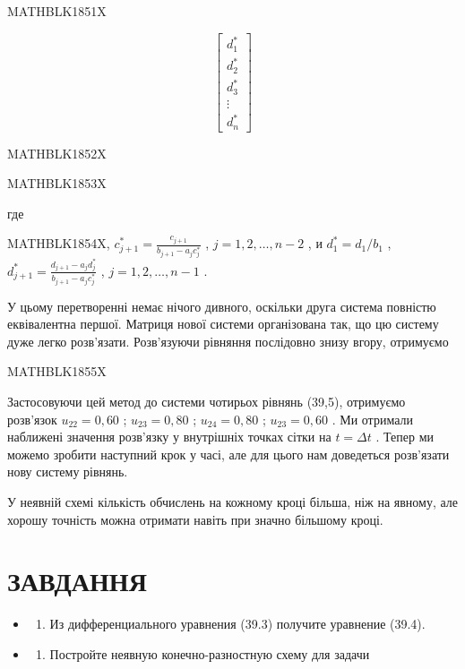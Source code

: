 \documentclass[
  ukrainian,
]{article}
\providecommand{\tightlist}{%
  \setlength{\itemsep}{0pt}\setlength{\parskip}{0pt}}
\begin{document}
MATHBLK1851X

\[
\begin{bmatrix} d_1^* \\ d_2^* \\ d_3^* \\ \vdots \\ d_n^* \end{bmatrix}
\]

MATHBLK1852X

MATHBLK1853X

где

MATHBLK1854X, \(c_{j+1}^* = \frac{c_{j+1}}{b_{j+1} - a_j c_j^*}\) ,
\(j = 1, 2, \ldots, n-2\) , и \(d_1^* = d_1/b_1\) ,
\(d_{j+1}^* = \frac{d_{j+1} - a_j d_j^*}{b_{j+1} - a_j c_j^*}\) ,
\(j = 1, 2, \ldots, n-1\) .

У цьому перетворенні немає нічого дивного, оскільки друга система
повністю еквівалентна першої. Матриця нової системи організована так, що
цю систему дуже легко розв'язати. Розв'язуючи рівняння послідовно знизу
вгору, отримуємо

MATHBLK1855X

Застосовуючи цей метод до системи чотирьох рівнянь (39,5), отримуємо
розв'язок \(u_{22}=0,60\) ; \(u_{23}=0,80\) ; \(u_{24}=0,80\) ;
\(u_{23}=0,60\) . Ми отримали наближені значення розв'язку у внутрішніх
точках сітки на \(t=\Delta t\) . Тепер ми можемо зробити наступний крок
у часі, але для цього нам доведеться розв'язати нову систему рівнянь.

У неявній схемі кількість обчислень на кожному кроці більша, ніж на
явному, але хорошу точність можна отримати навіть при значно більшому
кроці.

\section{ЗАВДАННЯ}\label{ux437ux430ux432ux434ux430ux43dux43dux44f-3}

\begin{itemize}
\tightlist
\item
  \begin{enumerate}
  \def\labelenumi{\arabic{enumi}.}
  \tightlist
  \item
    Из дифференциального уравнения (39.3) получите уравнение (39.4).
  \end{enumerate}
\item
  \begin{enumerate}
  \def\labelenumi{\arabic{enumi}.}
  \setcounter{enumi}{1}
  \tightlist
  \item
    Постройте неявную конечно-разностную схему для задачи
  \end{enumerate}
\end{itemize}
\end{document}
